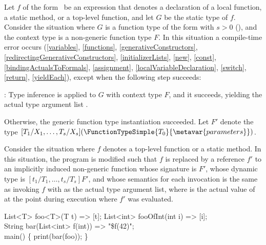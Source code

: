 \documentclass[makeidx]{article}
\begin{document}
{\LMHash{}%
Let $f$ of the form
~be
an expression that denotes
a declaration of a local function, a static method, or a top-level function,
and let $G$ be the static type of $f$.
Consider the situation where $G$ is a function type of the form
with $s > 0$
(),
and the context type is a non-generic function type $F$.
In this situation a compile-time error occurs
(\ref{variables},
\ref{functions},
\ref{generativeConstructors},
\ref{redirectingGenerativeConstructors},
\ref{initializerLists},
\ref{new},
\ref{const},
\ref{bindingActualsToFormals},
\ref{assignment},
\ref{localVariableDeclaration},
\ref{switch},
\ref{return},
\ref{yieldEach}),
except when the following step succeeds:

\LMHash{}%
:
Type inference is applied to $G$ with context type $F$,
and it succeeds, yielding the actual type argument list
.


\LMHash{}%
Otherwise, the generic function type instantiation succeeded.
Let $F'$ denote the type
$[T_1/X_1, \ldots, T_s/X_s]%
(\FunctionTypeSimple{T_0}{\metavar{parameters}})$.

\LMHash{}%
Consider the situation where $f$ denotes
a top-level function or a static method.
%
In this situation, the program is modified such that $f$ is replaced by
a reference $f'$ to an implicitly induced non-generic function
whose signature is $F'$,
whose dynamic type is $[t_1/T_1, \ldots, t_s/T_s]F'$,
and whose semantics for each invocation is the same as
invoking $f$ with  as the actual type argument list,
where  is the actual value of 
at the point during execution where $f'$ was evaluated.

\begin{dartCode}
List<T> foo<T>(T t) => [t];
List<int> fooOfInt(int i) => [i];
\\
String bar(List<int> f(int)) => "\${f(42)}";
\\
\VOID{} main() \{
  print(bar(foo));
\}
\end{dartCode}

}
\end{document}
